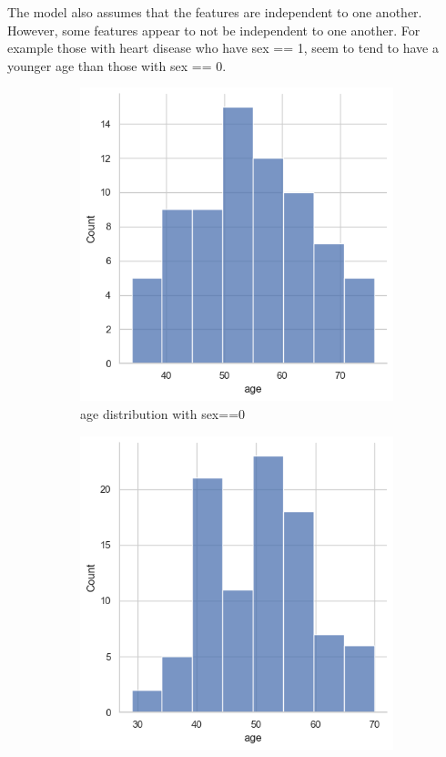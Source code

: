 \documentclass{article}
\begin{document}
\begin{enumerate}[leftmargin=\labelsep]
The model also assumes that the features are independent to one another. However, some features appear to not be independent to one another.
For example those with heart disease who have sex == 1, seem to tend to have a younger age than those with sex == 0.
\begin{figure}[H]
    \centering
    \begin{subfigure}{0.4\linewidth}
        \centering
        \includegraphics[width=\linewidth]{img/age_sex0.png}
        \caption{age distribution with sex==0}
        \label{fig:cp}
    \end{subfigure}
    \hfill %
    \begin{subfigure}{0.4\linewidth}
        \centering
        \includegraphics[width=\linewidth]{img/age_sex1.png}

\end{subfigure}
\end{figure}
\end{enumerate}
\end{document}
